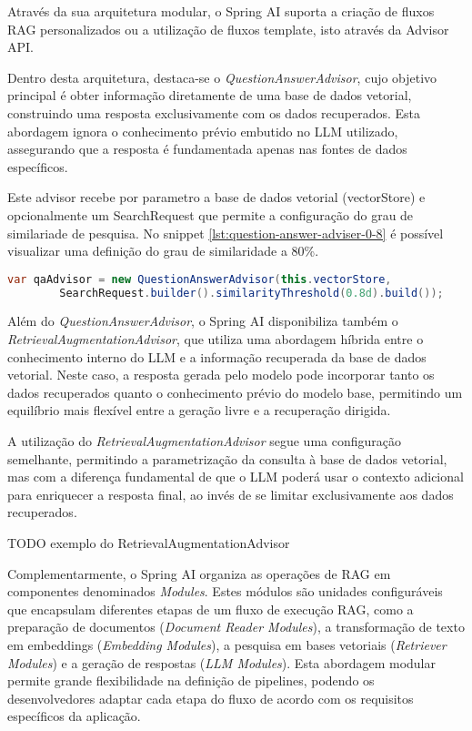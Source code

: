 Através da sua arquitetura modular, o Spring AI suporta a criação de fluxos RAG personalizados ou a utilização de fluxos template, isto através da Advisor API. 

Dentro desta arquitetura, destaca-se o \emph{QuestionAnswerAdvisor}, cujo objetivo principal é obter informação diretamente de uma base de dados vetorial, construindo uma resposta exclusivamente com os dados recuperados. Esta abordagem ignora o conhecimento prévio embutido no LLM utilizado, assegurando que a resposta é fundamentada apenas nas fontes de dados específicos.

Este advisor recebe por parametro a base de dados vetorial (vectorStore) e opcionalmente um SearchRequest que permite a configuração do grau de similariade de pesquisa. No snippet \ref{lst:question-answer-adviser-0-8} é possível visualizar uma definição do grau de similaridade a 80\%.


\begin{lstlisting}[language=Java, caption={Configuração do grau de similaridade do QuestionAnswerAdvisor}, label={lst:question-answer-adviser-0-8}]
var qaAdvisor = new QuestionAnswerAdvisor(this.vectorStore,
        SearchRequest.builder().similarityThreshold(0.8d).build());
\end{lstlisting}


Além do \emph{QuestionAnswerAdvisor}, o Spring AI disponibiliza também o \emph{RetrievalAugmentationAdvisor}, que utiliza uma abordagem híbrida entre o conhecimento interno do LLM e a informação recuperada da base de dados vetorial. Neste caso, a resposta gerada pelo modelo pode incorporar tanto os dados recuperados quanto o conhecimento prévio do modelo base, permitindo um equilíbrio mais flexível entre a geração livre e a recuperação dirigida.

A utilização do \emph{RetrievalAugmentationAdvisor} segue uma configuração semelhante, permitindo a parametrização da consulta à base de dados vetorial, mas com a diferença fundamental de que o LLM poderá usar o contexto adicional para enriquecer a resposta final, ao invés de se limitar exclusivamente aos dados recuperados.

TODO exemplo do RetrievalAugmentationAdvisor

Complementarmente, o Spring AI organiza as operações de RAG em componentes denominados \emph{Modules}. Estes módulos são unidades configuráveis que encapsulam diferentes etapas de um fluxo de execução RAG, como a preparação de documentos (\emph{Document Reader Modules}), a transformação de texto em embeddings (\emph{Embedding Modules}), a pesquisa em bases vetoriais (\emph{Retriever Modules}) e a geração de respostas (\emph{LLM Modules}). Esta abordagem modular permite grande flexibilidade na definição de pipelines, podendo os desenvolvedores adaptar cada etapa do fluxo de acordo com os requisitos específicos da aplicação.


